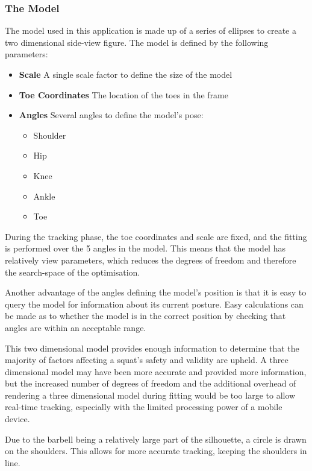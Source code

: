 \subsubsection{The Model}
\label{subsec:model}

The model used in this application is made up of a series of ellipses to create a two dimensional side-view figure. The model is defined by the following parameters:

\begin{itemize}
	\item \textbf{Scale} A single scale factor to define the size of the model
	\item \textbf{Toe Coordinates} The location of the toes in the frame
	\item \textbf{Angles} Several angles to define the model's pose:
		\begin{itemize}
			\item Shoulder
			\item Hip
			\item Knee
			\item Ankle
			\item Toe
		\end{itemize}
\end{itemize}

During the tracking phase, the toe coordinates and scale are fixed, and the fitting is performed over the 5 angles in the model. This means that the model has relatively view parameters, which reduces the degrees of freedom and therefore the search-space of the optimisation.

Another advantage of the angles defining the model's position is that it is easy to query the model for information about its current posture. Easy calculations can be made as to whether the model is in the correct position by checking that angles are within an acceptable range.

This two dimensional model provides enough information to determine that the majority of factors affecting a squat's safety and validity are upheld. A three dimensional model may have been more accurate and provided more information, but the increased number of degrees of freedom and the additional overhead of rendering a three dimensional model during fitting would be too large to allow real-time tracking, especially with the limited processing power of a mobile device.

Due to the barbell being a relatively large part of the silhouette, a circle is drawn on the shoulders. This allows for more accurate tracking, keeping the shoulders in line.

